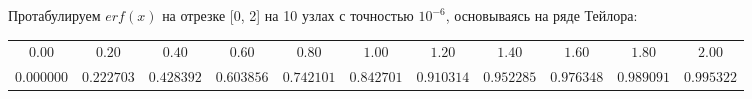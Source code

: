 Протабулируем $erf(x)$ на отрезке [0, 2] на 10 узлах с точностью $10^{-6}$, основываясь на ряде Тейлора:\\
\begin{tabular}{ccccccccccc}
\hline
$0.00$&$0.20$&$0.40$&$0.60$&$0.80$&$1.00$&$1.20$&$1.40$&$1.60$&$1.80$&$2.00$\\
$0.000000$&$0.222703$&$0.428392$&$0.603856$&$0.742101$&$0.842701$&$0.910314$&$0.952285$&$0.976348$&$0.989091$&$0.995322$\\
\end{tabular}